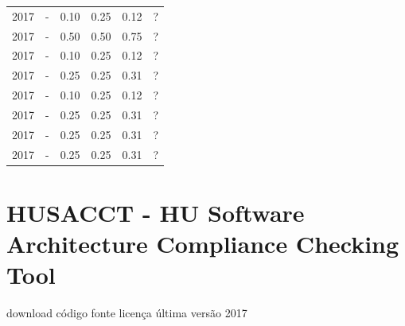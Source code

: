\begin{table}[H]
\begin{tabular}{| l | c | c | c | c | c |}
            2017
          &
          -
          &
          0.10
          &
          0.25
          &
            {\color{red} 0.12}
          &
          ?
          \\
            2017
          &
          -
          &
          0.50
          &
          0.50
          &
            {\color{blue} 0.75}
          &
          ?
          \\
            2017
          &
          -
          &
          0.10
          &
          0.25
          &
            {\color{red} 0.12}
          &
          ?
          \\
            2017
          &
          -
          &
          0.25
          &
          0.25
          &
            {\color{red} 0.31}
          &
          ?
          \\
            2017
          &
          -
          &
          0.10
          &
          0.25
          &
            {\color{red} 0.12}
          &
          ?
          \\
            2017
          &
          -
          &
          0.25
          &
          0.25
          &
            {\color{red} 0.31}
          &
          ?
          \\
            2017
          &
          -
          &
          0.25
          &
          0.25
          &
            {\color{red} 0.31}
          &
          ?
          \\
            2017
          &
          -
          &
          0.25
          &
          0.25
          &
            {\color{red} 0.31}
          &
          ?
          \\
\hline
\end{tabular}
\end{table}



\section{HUSACCT - HU Software Architecture Compliance Checking Tool}
\checkmark download
\checkmark código fonte
\checkmark licença
\checkmark última versão 2017



